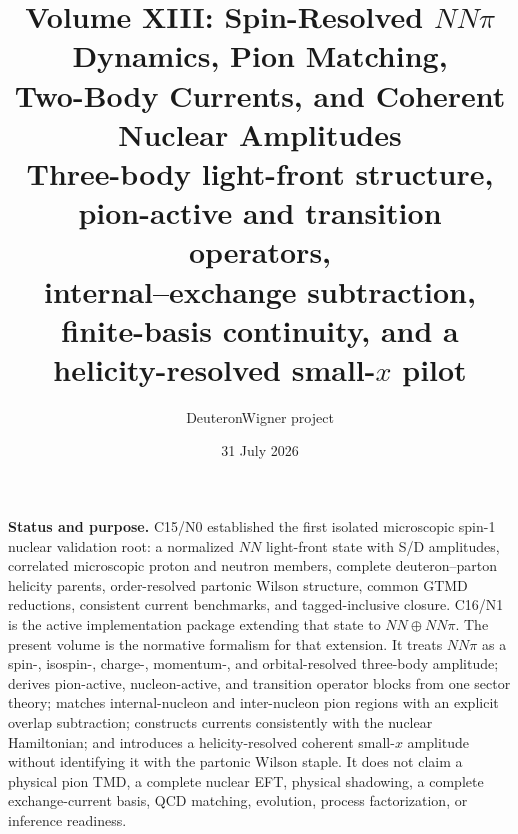 \documentclass[11pt]{article}
\title{\vspace{-1.0cm}
{\color{navy}\bfseries Volume XIII: Spin-Resolved \(NN\pi\) Dynamics, Pion Matching,\\[2mm]
Two-Body Currents, and Coherent Nuclear Amplitudes}\\[4mm]
\large Three-body light-front structure, pion-active and transition operators,\\
internal--exchange subtraction, finite-basis continuity, and a helicity-resolved small-\(x\) pilot}
\author{DeuteronWigner project}
\date{31 July 2026}
\begin{document}
\maketitle

\begin{center}
\begin{minipage}{0.94\textwidth}
\colorbox{softblue}{\parbox{0.96\textwidth}{
\textbf{Status and purpose.}
C15/N0 established the first isolated microscopic spin-1 nuclear validation
root: a normalized \(NN\) light-front state with S/D amplitudes, correlated
microscopic proton and neutron members, complete deuteron--parton helicity
parents, order-resolved partonic Wilson structure, common GTMD reductions,
consistent current benchmarks, and tagged-inclusive closure.  C16/N1 is the
active implementation package extending that state to \(NN\oplus NN\pi\).
The present volume is the normative formalism for that extension.  It treats
\(NN\pi\) as a spin-, isospin-, charge-, momentum-, and orbital-resolved
three-body amplitude; derives pion-active, nucleon-active, and transition
operator blocks from one sector theory; matches internal-nucleon and
inter-nucleon pion regions with an explicit overlap subtraction; constructs
currents consistently with the nuclear Hamiltonian; and introduces a
helicity-resolved coherent small-\(x\) amplitude without identifying it with
the partonic Wilson staple.  It does not claim a physical pion TMD, a complete
nuclear EFT, physical shadowing, a complete exchange-current basis, QCD
matching, evolution, process factorization, or inference readiness.
}}
\end{minipage}
\end{center}
\end{document}
